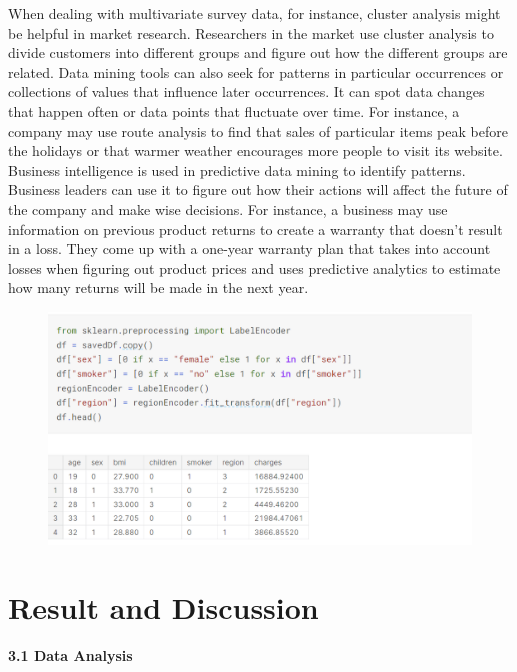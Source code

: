 \documentclass[journal]{IEEEtran}
\begin{document}
When dealing with multivariate survey data, for instance, cluster analysis might be helpful in market research. Researchers in the market use cluster analysis to divide customers into different groups and figure out how the different groups are related. Data mining tools can also seek for patterns in particular occurrences or collections of values that influence later occurrences. It can spot data changes that happen often or data points that fluctuate over time. For instance, a company may use route analysis to find that sales of particular items peak before the holidays or that warmer weather encourages more people to visit its website. Business intelligence is used in predictive data mining to identify patterns. Business leaders can use it to figure out how their actions will affect the future of the company and make wise decisions. For instance, a business may use information on previous product returns to create a warranty that doesn't result in a loss. They come up with a one-year warranty plan that takes into account losses when figuring out product prices and uses predictive analytics to estimate how many returns will be made in the next year.

 \begin{figure}[h]
  \centering
  \includegraphics [width= 3.55 in]{6.png}
\caption{}
  \label{storage}
\end{figure}

\section{Result and Discussion }

\textbf{3.1 Data Analysis}
\end{document}
